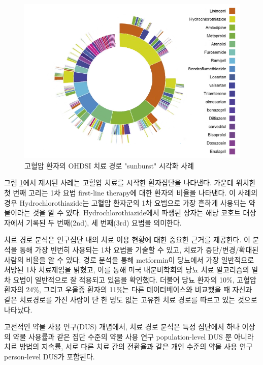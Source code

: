 \documentclass[10.5pt]{book}
\theoremstyle{definition}
\theoremstyle{definition}
\theoremstyle{definition}
\theoremstyle{remark}
\begin{document}
\begin{figure}

{\centering \includegraphics[width=1\linewidth]{images/Characterization/pnasTreatmentPathwaysSunburst} 

}

\caption{고혈압 환자의 OHDSI 치료 경로 "sunburst" 시각화 사례}\label{fig:treatmentPathwaysSunburstDataViz}
\end{figure}

그림 \ref{fig:treatmentPathwaysSunburstDataViz}에서 제시된 사례는 고혈압
치료를 시작한 환자집단을 나타낸다. 가운데 위치한 첫 번째 고리는 1차 요법
first-line therapy에 대한 환자의 비율을 나타낸다. 이 사례의 경우
Hydrochlorothiazide는 고혈압 환자군의 1차 요법으로 가장 흔하게 사용되는
약물이라는 것을 알 수 있다. Hydrochlorothiazide에서 파생된 상자는 해당
코호트 대상자에서 기록된 두 번째(2nd), 세 번째(3rd) 요법을 의미한다.

치료 경로 분석은 인구집단 내의 치료 이용 현황에 대한 중요한 근거를
제공한다. 이 분석을 통해 가장 빈번히 사용되는 1차 요법을 기술할 수 있고,
치료가 중단/변경/확대된 사람의 비율을 알 수 있다. 경로 분석을 통해
metformin이 당뇨에서 가장 일반적으로 처방된 1차 치료제임을 밝혔고, 이를
통해 미국 내분비학회의 당뇨 치료 알고리즘의 일차 요법이 일반적으로 잘
적용되고 있음을 확인했다. 더불어 당뇨 환자의 10\%, 고혈압 환자의 24\%,
그리고 우울증 환자의 11\%는 다른 데이터베이스와 비교했을 때 자신과 같은
치료경로를 가진 사람이 단 한 명도 없는 고유한 치료 경로를 따르고 있는
것으로 나타났다.

고전적인 약물 사용 연구(DUS) 개념에서, 치료 경로 분석은 특정 집단에서
하나 이상의 약물 사용률과 같은 집단 수준의 약물 사용 연구
population-level DUS 뿐 아니라 치료 방법의 지속률, 서로 다른 치료 간의
전환율과 같은 개인 수준의 약물 사용 연구 person-level DUS가 포함된다.
\end{document}
